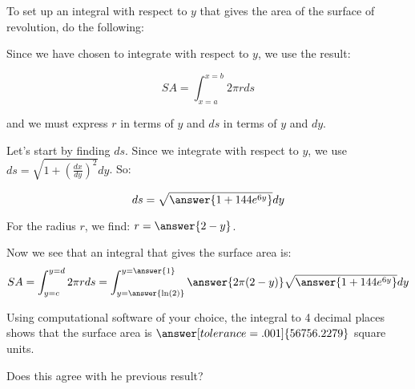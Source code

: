 \documentclass{ximera}
\begin{document}
\begin{exercise}

To set up an integral with respect to $y$ that gives the area of the surface of revolution, do the following:  

Since we have chosen to integrate with respect to $y$, we use the result:

\[ SA = \int_{x=a}^{x=b} 2 \pi r ds\]

and we must express $r$ in terms of $y$ and $ds$ in terms of $y$ and $dy$.  


Let's start by finding $ds$.  Since we integrate with respect to $y$, we use $ds = \sqrt{1+\left(\frac{dx}{dy}\right)^2} dy$. So: 

\[
ds = \sqrt{\answer{1+144e^{6y}}} dy
\]


\begin{exercise}
For the radius $r$, we find: $r=\answer{2-y}$.  


\begin{exercise}
Now we see that an integral that gives the surface area is: 
\[
SA= \int_{y=c}^{y=d} 2 \pi r ds = \int_{y=\answer{\ln(2)}}^{y=\answer{1}} \answer{ 2\pi (2-y)} \sqrt{\answer{1+144e^{6y}}} dy
\]

\begin{exercise}
Using computational software of your choice, the integral to 4 decimal places shows that the surface area is $\answer[tolerance=.001]{56756.2279}$ square units.  

Does this agree with he previous result?

\begin{multipleChoice}
\end{multipleChoice}

\end{exercise}



\end{exercise}
\end{exercise}
\end{exercise}
\end{document}
